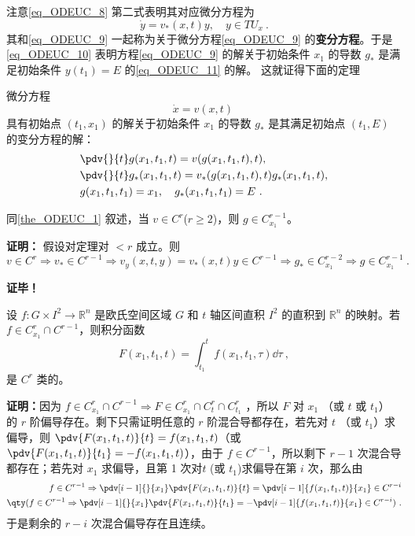 注意\autoref{eq_ODEUC_8} 第二式表明其对应微分方程为
\begin{equation}\label{eq_ODEUC_11}
\dot y=v_*(x,t)y,\quad y\in TU_x~.
\end{equation}
其和\autoref{eq_ODEUC_9} 一起称为关于微分方程\autoref{eq_ODEUC_9} 的\textbf{变分方程}。于是\autoref{eq_ODEUC_10} 表明方程\autoref{eq_ODEUC_9} 的解关于初始条件 $x_1$ 的导数 $g_*$ 是满足初始条件 $y(t_1)=E$ 的\autoref{eq_ODEUC_11} 的解。
这就证得下面的定理
\begin{theorem}{}
微分方程
\begin{equation}
\dot x=v(x,t)~
\end{equation}
 具有初始点 $(t_1,x_1)$ 的解关于初始条件 $x_1$ 的导数 $g_*$ 是其满足初始点 $(t_1,E)$ 的变分方程的解：
 \begin{equation}
 \begin{aligned}
 &\pdv{}{t}g(x_1,t_1,t)=v(g(x_1,t_1,t),t),\\
 &\pdv{}{t}g_*(x_1,t_1,t)=v_*(g(x_1,t_1,t),t)g_*(x_1,t_1,t),\\
 &g(x_1,t_1,t_1)=x_1,\quad g_*(x_1,t_1,t_1)=E~.
 \end{aligned}
 \end{equation}
\end{theorem}
\begin{theorem}{}
同\autoref{the_ODEUC_1} 叙述，当 $v\in C^r$($r\geq2$)，则 $g\in C_{x_1}^{r-1}$。
\end{theorem}
\textbf{证明：} 假设对定理对 $<r$ 成立。则
\begin{equation}
 v\in C^r\Rightarrow v_*\in C^{r-1}\Rightarrow v_y(x,t,y)=v_*(x,t)y\in C^{r-1}\Rightarrow g_*\in C_{x_1}^{r-2}\Rightarrow g\in C_{x_1}^{r-1}~.
\end{equation}

\textbf{证毕！}
\begin{lemma}{}\label{lem_ODEUC_1}
设 $f:G\times I^2\rightarrow \mathbb R^n$ 是欧氏空间区域 $G$ 和 $t$ 轴区间直积 $I^2$ 的直积到 $\mathbb R^n$ 的映射。若 $f\in C_{x_1}^r \cap C^{r-1}$，则积分函数
\begin{equation}
F(x_1,t_1,t)=\int_{t_1}^t f(x_1,t_1,\tau)\dd\tau~,
\end{equation}
是 $C^r$ 类的。
\end{lemma}
\textbf{证明：}因为 $f\in C_{x_1}^r\cap C^{r-1}\Rightarrow F\in C_{x_1}^r\cap C_t^{r}\cap C_{t_1}^{r}$ ，所以 $F$ 对 $x_1$ （或 $t$ 或 $t_1$） 的 $r$ 阶偏导存在。剩下只需证明任意的 $r$ 阶混合导都存在，若先对 $t$ （或 $t_1$）求偏导，则 $\pdv{F(x_1,t_1,t)}{t}=f(x_1,t_1,t)$（或 $\pdv{F(x_1,t_1,t)}{t_1}=-f(x_1,t_1,t)$），由于 $f\in C^{r-1}$，所以剩下 $r-1$ 次混合导都存在；若先对 $x_1$ 求偏导，且第 1 次对$t$ (或 $t_1$)求偏导在第 $i$ 次，那么由
\begin{equation}
\begin{aligned}
f\in C^{r-1}\Rightarrow\pdv[i-1]{}{x_1}\pdv{F(x_1,t_1,t)}{t}=\pdv[i-1]{f(x_1,t_1,t)}{x_1}\in C^{r-i} \\
\qty(f\in C^{r-1}\Rightarrow\pdv[i-1]{}{x_1}\pdv{F(x_1,t_1,t)}{t_1}=-\pdv[i-1]{f(x_1,t_1,t)}{x_1}\in C^{r-i} )~.
\end{aligned}
\end{equation}
于是剩余的 $r-i$ 次混合偏导存在且连续。

